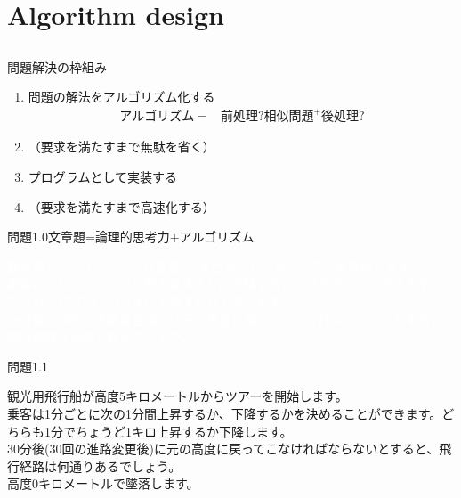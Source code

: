 \documentclass{beamer}
\subtitle{プログラミング的思考cntd.}
\begin{document}
\begin{frame}[fragile]{}
\titlepage
\end{frame}

\section{Algorithm design}		%
\subsection{}

\begin{frame}[fragile]{問題解決の枠組み}{}
\begin{enumerate}\itemsep8pt
\item 問題の解法をアルゴリズム化する
\begin{align*}
アルゴリズム = & 前処理? 相似問題^{+} 後処理?
\end{align*}
\item （要求を満たすまで無駄を省く）
\item プログラムとして実装する
\item （要求を満たすまで高速化する）
\end{enumerate}
\end{frame}

\begin{frame}[fragile]{問題1.0}{文章題=論理的思考力+アルゴリズム}
\begin{spacing}{1.25}
\textcolor{white}{
観光用スペースシャトルが高度100キロメートルからツアーを開始します。\\
乗客は1分ごとに次の1分間上昇するか、下降するかを決めることができます。どちらも1分でちょうど1キロ上昇するか下降します。\\
30分後（30回の進路変更後）に元の高度に戻ってこなければならないとすると、飛行経路は何通りあるでしょう。
}
\end{spacing}
\end{frame}

\begin{frame}[fragile]{問題1.1}{}

\begin{spacing}{1.25}
観光用飛行船が高度5キロメートルからツアーを開始します。\\
乗客は1分ごとに次の1分間上昇するか、下降するかを決めることができます。どちらも1分でちょうど1キロ上昇するか下降します。\\
30分後(30回の進路変更後)に元の高度に戻ってこなければならないとすると、飛行経路は何通りあるでしょう。\\
高度0キロメートルで墜落します。
\end{spacing}
\end{frame}
\end{document}
